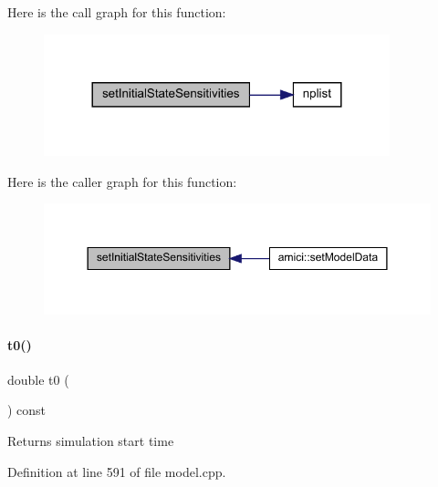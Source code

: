 Here is the call graph for this function\+:
\nopagebreak
\begin{figure}[H]
\begin{center}
\leavevmode
\includegraphics[width=284pt]{classamici_1_1_model_a82941b121d9db31d357642092a2cd41d_cgraph}
\end{center}
\end{figure}
Here is the caller graph for this function\+:
\nopagebreak
\begin{figure}[H]
\begin{center}
\leavevmode
\includegraphics[width=350pt]{classamici_1_1_model_a82941b121d9db31d357642092a2cd41d_icgraph}
\end{center}
\end{figure}
\mbox{\label{classamici_1_1_model_a223e567004c82b5facc2fe98cdd16855}} 
\paragraph{\texorpdfstring{t0()}{t0()}}
{\footnotesize\ttfamily double t0 (\begin{DoxyParamCaption}{ }\end{DoxyParamCaption}) const}

\begin{DoxyReturn}{Returns}
simulation start time 
\end{DoxyReturn}


Definition at line 591 of file model.\+cpp.

